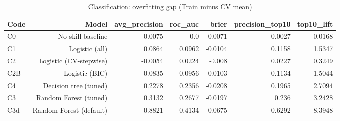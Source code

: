 \begin{table}[htbp]
\centering
\small
\caption{Classification: overfitting gap (Train minus CV mean)}
\begin{tabular}{lrrrrrr}
\toprule
Code & Model & avg\_precision & roc\_auc & brier & precision\_top10 & top10\_lift \\
\midrule
C0 & No-skill baseline & -0.0075 & 0.0 & -0.0071 & -0.0027 & 0.0168 \\
C1 & Logistic (all) & 0.0864 & 0.0962 & -0.0104 & 0.1158 & 1.5347 \\
C2 & Logistic (CV-stepwise) & -0.0054 & 0.0224 & -0.008 & 0.0227 & 0.3249 \\
C2B & Logistic (BIC) & 0.0835 & 0.0956 & -0.0103 & 0.1134 & 1.5044 \\
C4 & Decision tree (tuned) & 0.2278 & 0.2356 & -0.0208 & 0.1965 & 2.7094 \\
C3 & Random Forest (tuned) & 0.3132 & 0.2677 & -0.0197 & 0.236 & 3.2428 \\
C3d & Random Forest (default) & 0.8821 & 0.4134 & -0.0675 & 0.6292 & 8.3948 \\
\bottomrule
\end{tabular}
\par\smallskip\begin{minipage}{\linewidth}\footnotesize \end{minipage}
\end{table}

